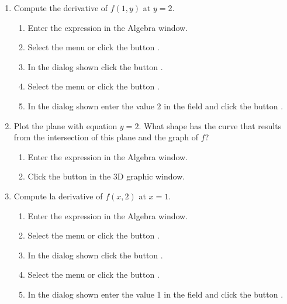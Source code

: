 \begin{enumerate}[leftmargin=*]
\begin{enumerate}
\item Compute the derivative of $f(1,y)$ at $y=2$.
\begin{indication}
\begin{enumerate}
\item Enter the expression  in the Algebra window.
\item Select the menu  or click the button .
\item In the dialog shown click the button .
\item Select the menu  or click the button .
\item In the dialog shown enter the value 2 in the field  and click the button .
\end{enumerate}
\end{indication}

\item Plot the plane with equation $y=2$. 
What shape has the curve that results from the intersection of this plane and the graph of $f$?
\begin{indication}
\begin{enumerate}
\item Enter the expression  in the Algebra window.
\item Click the button  in the 3D graphic window.
\end{enumerate}
\end{indication}

\item Compute la derivative of $f(x,2)$ at $x=1$.
\begin{indication}
\begin{enumerate}
\item Enter the expression  in the Algebra window.
\item Select the menu  or click the button .
\item In the dialog shown click the button .
\item Select the menu  or click the button .
\item In the dialog shown enter the value 1 in the field  and click the button .
\end{enumerate}
\end{indication}


\end{enumerate}
\end{enumerate}
